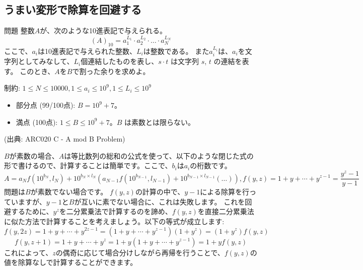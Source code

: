 \documentclass{jsarticle}
\begin{document}
  \subsection{うまい変形で除算を回避する}
  \label{subsec:avoiding-division}
  \begin{itembox}[l]{問題}
   整数$A$が、次のような10進表記で与えられる。
   \begin{displaymath}
    (A)_{10} = a_1^{L_1} \cdot a_2^{L_2} \cdot \dots \cdot a_N^{L_N}
   \end{displaymath}
   ここで、$a_i$は10進表記で与えられた整数、$L_i$は整数である。
   また$a_i^{L_i}$は、$a_i$を文字列としてみなして、$L_i$個連結したものを表し、$s \cdot t$ は文字列 $s$, $t$ の連結を表す。
   このとき、$A$を$B$で割った余りを求めよ。

   制約: $1 \le N \le 10000, 1\le a_i \le 10^9, 1 \le L_i \le 10^9$
   \begin{itemize}
    \item 部分点 (99/100点): $B = 10^9+7$。
    \item 満点 (100点): $1 \le B \le 10^9 + 7$。$B$ は素数とは限らない。
   \end{itemize}

   (出典: ARC020 C - A mod B Problem)
  \end{itembox}
  $B$が素数の場合、$A$は等比数列の総和の公式を使って、以下のような閉じた式の形で書けるので、計算することは簡単です。ここで、$b_i$は$a_i$の桁数です。
  \begin{displaymath}
   A = a_N f(10^{b_N},l_N)+10^{b_N \times l_N}(a_{N-1}f(10^{b_{N-1}},l_{N-1}) + 10^{b_{N-1} \times l_{N-1}} ( \ldots)),
   f(y,z) = 1+y+\cdots+y^{z-1} = \frac{y^z-1}{y-1}
  \end{displaymath}
  問題は$B$が素数でない場合です。
  $f(y,z)$の計算の中で、$y-1$による除算を行っていますが、$y-1$と$B$が互いに素でない場合に、これは失敗します。
  これを回避するために、$y^z$を二分累乗法で計算するのを諦め、$f(y,z)$を直接二分累乗法に似た方法で計算することを考えましょう。以下の等式が成立します:
  \begin{displaymath}
   f(y,2z) = 1+y+\cdots+y^{2z-1}=(1+y+\cdots+y^{z-1})(1+y^z)=(1+y^z)f(y,z)
  \end{displaymath}
  \begin{displaymath}
   f(y,z+1)=1+y+\cdots+y^{z}=1+y(1+y+\cdots+y^{z-1})=1+yf(y,z)
  \end{displaymath}
  これによって、$z$の偶奇に応じて場合分けしながら再帰を行うことで、$f(y,z)$の値を除算なしで計算することができます。
\end{document}
